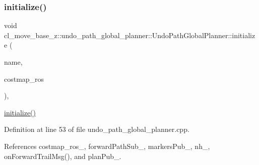 \mbox{\label{classcl__move__base__z_1_1undo__path__global__planner_1_1UndoPathGlobalPlanner_a69e0fbb98872f108f679b2a6620638f5}} 
\subsubsection{\texorpdfstring{initialize()}{initialize()}}
{\footnotesize\ttfamily void cl\+\_\+move\+\_\+base\+\_\+z\+::undo\+\_\+path\+\_\+global\+\_\+planner\+::\+Undo\+Path\+Global\+Planner\+::initialize (\begin{DoxyParamCaption}\item[{std\+::string}]{name,  }\item[{costmap\+\_\+2d\+::\+Costmap2\+D\+R\+OS $\ast$}]{costmap\+\_\+ros }\end{DoxyParamCaption})\hspace{0.3cm}{\ttfamily [override]}, {\ttfamily [virtual]}}

\hyperlink{classcl__move__base__z_1_1undo__path__global__planner_1_1UndoPathGlobalPlanner_a69e0fbb98872f108f679b2a6620638f5}{initialize()} 

Definition at line 53 of file undo\+\_\+path\+\_\+global\+\_\+planner.\+cpp.



References costmap\+\_\+ros\+\_\+, forward\+Path\+Sub\+\_\+, markers\+Pub\+\_\+, nh\+\_\+, on\+Forward\+Trail\+Msg(), and plan\+Pub\+\_\+.


